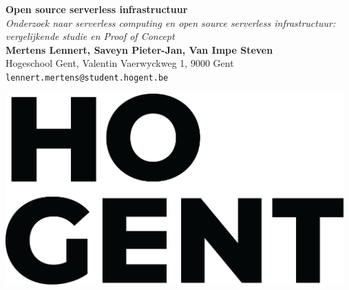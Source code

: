 \documentclass[a0,portrait]{a0poster}
\begin{document}


\begin{minipage}[t]{0.75\linewidth}
\VeryHuge \color{HoGentAccent1} \textbf{Open source serverless infrastructuur} \color{Black}\\ %
\Huge\textit{Onderzoek naar serverless computing en open source serverless infrastructuur: vergelijkende studie en Proof of Concept}\\[2.4cm] %
\huge \textbf{Mertens Lennert, Saveyn Pieter-Jan, Van Impe Steven}\\[0.5cm] %
\huge Hogeschool Gent, Valentin Vaerwyckweg 1, 9000 Gent\\[0.4cm] %
\Large \texttt{lennert.mertens@student.hogent.be} \\
\end{minipage}
%
\begin{minipage}[t]{0.25\linewidth}
\includegraphics[width=13cm,right]{figures/HOGENT_Logo_Pos_rgb.png} 

\end{minipage}

\vspace{1cm} %

\end{document}
